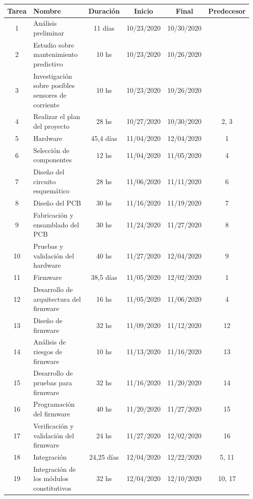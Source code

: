 \documentclass[11pt]{charter}
\begin{document}
\begin{table}[htpb]
\centering
\begin{tabularx}{\linewidth}{@{}|c|X|c|c|c|c|@{}}
\hline
\rowcolor[HTML]{C0C0C0} 
Tarea & Nombre & Duración & Inicio & Final & Predecesor \\ \hline
1 & Análisis preliminar & 11 días &  10/23/2020 & 10/30/2020 & \\ \hline
2 & Estudio sobre mantenimiento predictivo &  10 hs & 10/23/2020 & 	10/26/2020	 &\\ \hline
3 & Investigación sobre posibles sensores de corriente &  10 hs & 10/23/2020 & 10/26/2020	 & \\ \hline
4 & Realizar el plan del proyecto &  28 hs & 10/27/2020 & 	10/30/2020 & 2, 3 \\ \hline		
5 & Hardware &  45,4 días & 11/04/2020 & 	12/04/2020 & 1\\ \hline
6 & Selección de componentes &  12 hs & 11/04/2020 & 	11/05/2020 & 4\\ \hline
7 & Diseño del circuito esquemático &  28 hs & 11/06/2020 & 	11/11/2020	 &6\\ \hline
8 & Diseño del PCB &  30 hs & 11/16/2020 & 	11/19/2020 &7\\ \hline
9 & Fabricación y ensamblado del PCB &  30 hs & 11/24/2020 & 	11/27/2020	 & 8\\ \hline
10 & Pruebas y validación del hardware &  40 hs & 11/27/2020 & 	12/04/2020	 & 9	\\ \hline
11 & Firmware &  38,5 días &11/05/2020	 & 12/02/2020 &  1\\ \hline
12 & Desarrollo de arquitectura del firmware &   16 hs & 11/05/2020 & 	11/06/2020 & 4\\ \hline
13 & Diseño de firmware &  32 hs & 11/09/2020 & 	11/12/2020 & 12\\ \hline
14 & Análisis de riesgos de firmware &  10 hs & 11/13/2020 & 	11/16/2020 & 13\\ \hline
15 & Desarrollo de pruebas para firmware &  32 hs & 11/16/2020 & 	11/20/2020 & 14\\ \hline
16 & Programación del firmware &  40 hs & 11/20/2020 & 	11/27/2020 & 15\\ \hline
17 & Verificación y validación del firmware  & 24 hs &11/27/2020 & 	12/02/2020 & 16 \\ \hline
18 & Integración &  24,25 días & 12/04/2020 & 	12/22/2020 &5, 11\\ \hline
19 & Integración de los módulos constitutivos &  32 hs & 12/04/2020 & 	12/10/2020 & 10, 17\\ \hline

\end{tabularx}
\end{table}
\end{document}
